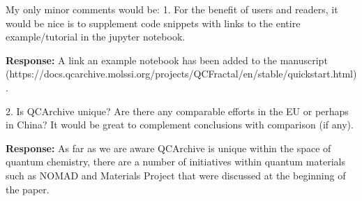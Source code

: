 My only minor comments would be:
1.	For the benefit of users and readers, it would be nice is to supplement code snippets with links to the entire example/tutorial in the jupyter notebook.

\textbf{Response:} A link an example notebook has been added to the manuscript (https://docs.qcarchive.molssi.org/projects/QCFractal/en/stable/quickstart.html).

2.	Is QCArchive unique? Are there any comparable efforts in the EU or perhaps in China? It would be great to complement conclusions with comparison (if any).

\textbf{Response:} As far as we are aware QCArchive is unique within the space of quantum chemistry, there are a number of initiatives within quantum materials such as NOMAD and Materials Project that were discussed at the beginning of the paper.
